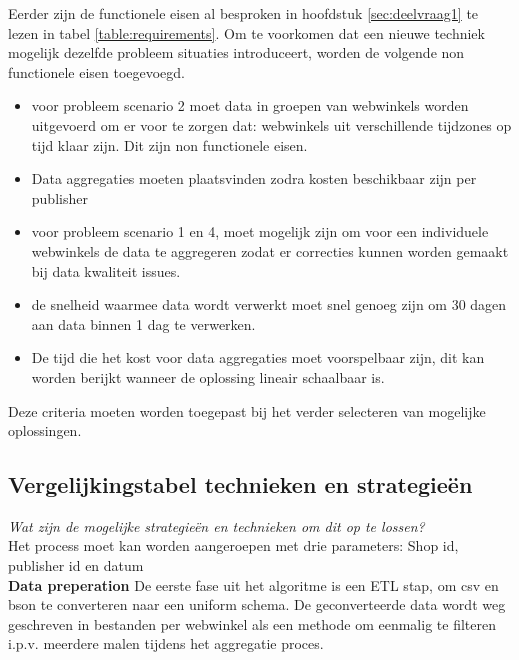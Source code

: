 Eerder zijn de functionele eisen al besproken in hoofdstuk \ref{sec:deelvraag1} te lezen in tabel \ref{table:requirements}. Om te voorkomen dat een nieuwe techniek mogelijk dezelfde probleem situaties introduceert, worden de volgende non functionele eisen toegevoegd.
\begin{itemize}
    \item voor probleem scenario 2 moet data in groepen van webwinkels worden uitgevoerd om er voor te zorgen dat: webwinkels uit verschillende tijdzones op tijd klaar zijn. Dit zijn non functionele eisen. 
    
    \item Data aggregaties moeten plaatsvinden zodra kosten beschikbaar zijn per publisher
    
    \item voor probleem scenario 1 en 4, moet mogelijk zijn om voor een individuele webwinkels de data te aggregeren zodat er correcties kunnen worden gemaakt bij data kwaliteit issues. 
    \item de snelheid waarmee data wordt verwerkt moet snel genoeg zijn om 30 dagen aan data binnen 1 dag te verwerken.
    
    \item De tijd die het kost voor data aggregaties moet voorspelbaar zijn, dit kan worden berijkt  wanneer de oplossing lineair schaalbaar is.
\end{itemize}

Deze criteria moeten worden toegepast bij het verder selecteren van mogelijke oplossingen. 


\clearpage


\subsection{Vergelijkingstabel technieken en strategieën}
\label{subsec:deelvraag3b}

\textit{Wat zijn de mogelijke strategieën en technieken om dit op te lossen?} \\


Het process moet kan worden aangeroepen met drie  parameters: Shop id, publisher id en datum \\

\textbf{Data preperation}
De eerste fase uit het algoritme is een ETL stap, om csv en bson te converteren naar een uniform schema.
De geconverteerde data wordt weg geschreven in bestanden per webwinkel als een methode om eenmalig te filteren i.p.v. meerdere malen tijdens het aggregatie proces. \\




